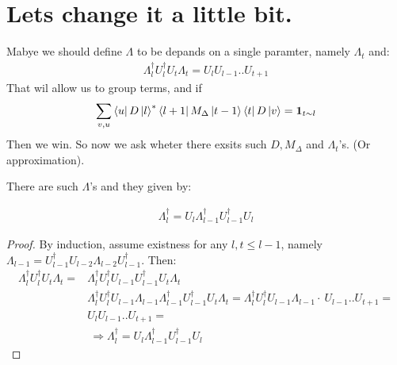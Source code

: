 \documentclass[manuscript,screen,review]{acmart}
\begin{document}
\section{Lets change it a little bit.}
Mabye we should define $\Lambda$ to be depands on a single paramter, namely $\Lambda_{t}$ and: 
\begin{equation*}
   \begin{split}
     \Lambda^{\dagger}_{l} U_{l}^{\dagger}U_{t} \Lambda_{t} = U_{l}U_{l-1}..U_{t+1}
   \end{split}
 \end{equation*}
 That wil allow us to group terms, and if 
\begin{equation*}
  \begin{split}
     \sum_{v,u}\bra{u}D\ket{l}^{*}\bra{l+1}M_{\Delta}\ket{t-1} \bra{t} D\ket{v} = \mathbf{1}_{ t \sim l } %
  \end{split}
\end{equation*}
Then we win. So now we ask wheter there exsits such $D,M_{\Delta}$ and $\Lambda_{t}$'s. (Or approximation).   
\begin{claim}
  There are such $\Lambda$'s and they given by: 
  
  \begin{equation*}
    \begin{split}
      \Lambda_{l}^{\dagger} = U_{l}\Lambda_{l-1}^{\dagger}U_{l-1}^{\dagger}U_{l}
    \end{split}
  \end{equation*}
\end{claim}
\begin{proof}
  By induction, assume existness for any  $l,t \le l-1$, namely $\Lambda_{l-1}= U_{l-1}^{\dagger}U_{l-2}\Lambda_{l-2}U^{\dagger}_{l-1}$. Then:  
\begin{equation*}
    \begin{split} 
      \Lambda^{\dagger}_{l} U_{l}^{\dagger}U_{t} \Lambda_{t} = &   \Lambda^{\dagger}_{l} U_{l}^{\dagger}U_{l-1}U_{l-1}^{\dagger}U_{t} \Lambda_{t} \\ 
      & \Lambda^{\dagger}_{l} U_{l}^{\dagger}U_{l-1}\Lambda_{l-1}\Lambda^{\dagger}_{l-1}U_{l-1}^{\dagger}U_{t} \Lambda_{t} = \Lambda^{\dagger}_{l} U_{l}^{\dagger}U_{l-1}\Lambda_{l-1} \cdot \ U_{l-1}..U_{t+1}  = \\ 
      & U_{l}U_{l-1}..U_{t+1} = \\ 
      & \ \Rightarrow   \Lambda_{l}^{\dagger} = U_{l}\Lambda_{l-1}^{\dagger}U_{l-1}^{\dagger}U_{l}
    \end{split}
  \end{equation*}
\end{proof}
\end{document}
